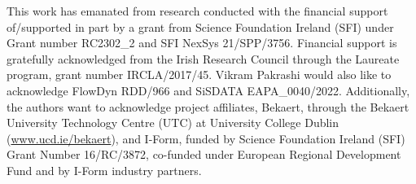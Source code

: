 \documentclass[sn-mathphys,Numbered,draft]{sn-jnl}%
\begin{document}
\noindent This work has emanated from research conducted with the financial support of/supported in part by a grant from Science Foundation Ireland (SFI) under Grant number RC2302\_2 and SFI NexSys 21/SPP/3756. Financial support is gratefully acknowledged from the Irish Research Council through the Laureate program, grant number IRCLA/2017/45. Vikram Pakrashi would also like to acknowledge FlowDyn RDD/966 and SiSDATA EAPA\_0040/2022. Additionally, the authors want to acknowledge project affiliates, Bekaert, through the Bekaert University Technology Centre (UTC) at University College Dublin (\url{www.ucd.ie/bekaert}), and I-Form, funded by Science Foundation Ireland (SFI) Grant Number 16/RC/3872, co-funded under European Regional Development Fund and by I-Form industry partners.


\newpage
\end{document}
